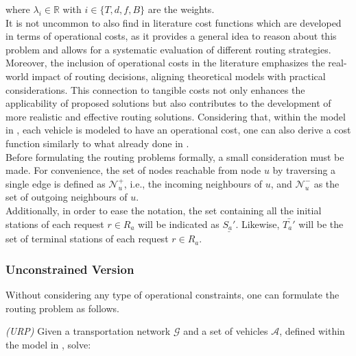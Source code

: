 where $\lambda_i \in \mathbb{R}$ with $i \in \{T, d,f, B\}$ are the weights.\\
It is not uncommon to also find in literature cost functions which are developed in terms of operational costs, as it provides a general idea to reason about this problem and allows for a systematic evaluation of different routing strategies. Moreover, the inclusion of operational costs in the literature emphasizes the real-world impact of routing decisions, aligning theoretical models with practical considerations. This connection to tangible costs not only enhances the applicability of proposed solutions but also contributes to the development of more realistic and effective routing solutions. Considering that, within the model in , each vehicle is modeled to have an operational cost, one can also derive a cost function similarly to what already done in \cite{project_thesis}. \\
Before formulating the routing problems formally, a small consideration must be made. For convenience, the set of nodes reachable from node $u$ by traversing a single edge is defined as $\mathcal{N}^+_u$, i.e., the incoming neighbours of $u$, and $\mathcal{N}^-_u$ as the set of outgoing neighbours of $u$.\\ Additionally, in order to ease the notation, the set containing all the initial stations of each request $r \in R_a$ will be indicated as $\underline{S_a'}$. Likewise, $\bar{T_a'}$ will be the set of terminal stations of each request $r \in R_a$. \\
\subsubsection*{Unconstrained Version}
Without considering any type of operational constraints, one can formulate the routing problem as follows. \\
\begin{algori}{\textit{(URP)}}
	Given a transportation network $\mathcal{G}$ and a set of vehicles $\mathcal{A}$, defined within the model in , solve:
\end{algori}


